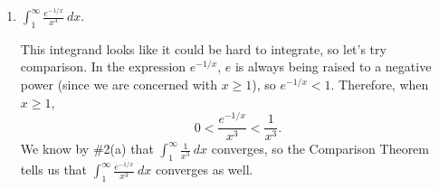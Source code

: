 \documentclass[main]{subfiles}
\begin{document}
\begin{enumerate}
\begin{enumerate}
\begin{solution}
          When $x \geq 4$, \[\frac{x^2}{x^3 - 1} > \frac{x^2}{x^3} =
          \frac{1}{x} > 0.\] We know by {{\#1}(b)} that
          $\displaystyle \int_1^\infty \frac{1}{x}~dx$ diverges, and the
          reasoning in {{\#5}(a)} shows that
          $\displaystyle \int_4^\infty \frac{1}{x}~dx$ diverges as well.  By
          the Comparison Theorem, $\displaystyle \int_4^\infty \frac{x^2}{x^3
          - 1}~dx$ diverges.
          \end{solution}

          
          \item
          \begin{problem}[\vfill]
          $\displaystyle \int_1^\infty \frac{e^{-1/x}}{x^3}~dx$.
          \end{problem}

          \begin{solution}
          This integrand looks like it could be hard to integrate, so let's
          try comparison.  In the expression $e^{-1/x}$, $e$ is always being
          raised to a negative power (since we are concerned with $x \geq 1$),
          so $e^{-1/x} < 1$.  Therefore, when $x \geq 1$, 
          \[ 0 < \frac{e^{-1/x}}{x^3} < \frac{1}{x^3}.\]
          We know by {{\#2}(a)} that $\displaystyle \int_1^\infty
          \frac{1}{x^3}~dx$ converges, so the Comparison Theorem tells us that
          $\displaystyle \int_1^\infty \frac{e^{-1/x}}{x^3}~dx$ converges as
          well. 
          \end{solution}
          
          
        \end{enumerate}



        
    

            
\end{enumerate}
\end{document}
